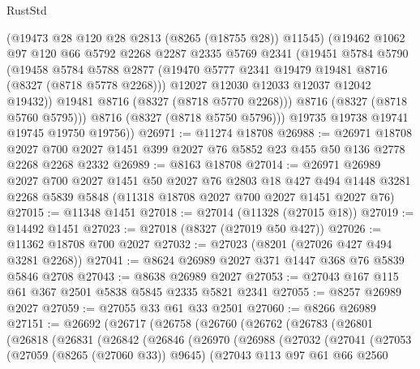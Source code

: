 \begin{lexlean}{RustStd}
\begin{coremodule}
            (@19473 @28 @120 @28 @2813 (@8265 (@18755 @28)) @11545)
            (@19462
              @1062
              @97
              @120
              @66
              @5792
              @2268
              @2287
              @2335
              @5769
              @2341
              (@19451
                @5784
                @5790
                (@19458
                  @5784
                  @5788
                  @2877
                  (@19470 @5777 @2341 @19479 @19481 @8716 (@8327 (@8718 @5778 @2268)))
                  @12027
                  @12030
                  @12033
                  @12037
                  @12042
                  @19432))
              @19481
              @8716
              (@8327 (@8718 @5770 @2268)))
            @8716
            (@8327 (@8718 @5760 @5795)))
          @8716
          (@8327 (@8718 @5750 @5796)))
        @19735
        @19738
        @19741
        @19745
        @19750
        @19756))
@26971 := @11274 @18708
@26988 := @26971
    @18708
    @2027
    @700
    @2027
    @1451
    @399
    @2027
    @76
    @5852
    @23
    @455
    @50
    @136
    @2778
    @2268
    @2268
    @2332
@26989 := @8163 @18708
@27014 := @26971
    @26989
    @2027
    @700
    @2027
    @1451
    @50
    @2027
    @76
    @2803
    @18
    @427
    @494
    @1448
    @3281
    @2268
    @5839
    @5848
    (@11318 @18708 @2027 @700 @2027 @1451 @2027 @76)
@27015 := @11348 @1451
@27018 := @27014 (@11328 (@27015 @18))
@27019 := @14492 @1451
@27023 := @27018 (@8327 (@27019 @50 @427))
@27026 := @11362 @18708 @700 @2027
@27032 := @27023 (@8201 (@27026 @427 @494 @3281 @2268))
@27041 := @8624 @26989 @2027 @371 @1447 @368 @76 @5839 @5846 @2708
@27043 := @8638 @26989 @2027
@27053 := @27043 @167 @115 @61 @367 @2501 @5838 @5845 @2335 @5821 @2341
@27055 := @8257 @26989 @2027
@27059 := @27055 @33 @61 @33 @2501
@27060 := @8266 @26989
@27151 := @26692
    (@26717
      (@26758
        (@26760
          (@26762
            (@26783
              (@26801
                (@26818
                  (@26831
                    (@26842
                      (@26846
                        (@26970
                          (@26988
                            (@27032
                              (@27041
                                (@27053
                                  (@27059 (@8265 (@27060 @33)) @9645)
                                  (@27043
                                    @113
                                    @97
                                    @61
                                    @66
                                    @2560

\end{coremodule}
\end{lexlean}

